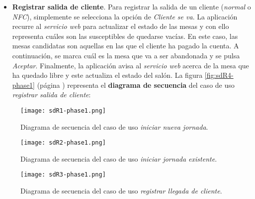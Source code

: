 \begin{itemize}
\item \textbf{Registrar salida de cliente}. Para registrar la salida de un
cliente (\emph{normal} o \emph{\acs{NFC}}), simplemente se selecciona la
opción de \emph{Cliente se va}. La aplicación recurre al \emph{servicio web}
para actualizar el estado de las mesas y con ello representa cuáles son las
susceptibles de quedarse vacías. En este caso, las mesas candidatas son
aquellas en las que el cliente ha pagado la cuenta. A continuación, se marca
cuál es la mesa que va a ser abandonada y se pulsa \emph{Aceptar}. Finalmente,
la aplicación avisa al \emph{servicio web} acerca de la mesa que ha quedado
libre y este actualiza el estado del salón. La figura \ref{fig:sdR4-phase1}
(página \pageref{fig:sdR4-phase1}) representa el \textbf{diagrama de secuencia}
del caso de uso \emph{registrar salida de cliente}:

\end{itemize}


  \begin{sidewaysfigure}[h]
    \begin{center}
      \texttt{[image: sdR1-phase1.png]}
      \caption{Diagrama de secuencia del caso de uso \emph{iniciar nueva
      jornada}.}
      \label{fig:sdR1-phase1}
    \end{center}
  \end{sidewaysfigure}

  \begin{sidewaysfigure}[h]
    \begin{center}
      \texttt{[image: sdR2-phase1.png]}
      \caption{Diagrama de secuencia del caso de uso \emph{iniciar jornada
      existente}.}
      \label{fig:sdR2-phase1}
    \end{center}
  \end{sidewaysfigure}

  \begin{sidewaysfigure}[h]
    \begin{center}
      \texttt{[image: sdR3-phase1.png]}
      \caption{Diagrama de secuencia del caso de uso \emph{registrar llegada
      de cliente}.}
      \label{fig:sdR3-phase1}
    \end{center}
  \end{sidewaysfigure}

